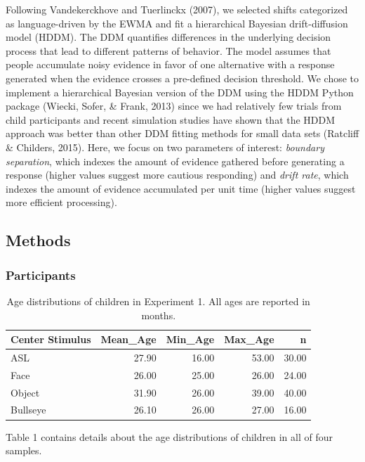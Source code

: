 \documentclass[english,floatsintext,man]{apa6}
\theoremstyle{definition}
\theoremstyle{definition}
\theoremstyle{definition}
\theoremstyle{remark}
\begin{document}
Following Vandekerckhove and Tuerlinckx (2007), we selected shifts
categorized as language-driven by the EWMA and fit a hierarchical
Bayesian drift-diffusion model (HDDM). The DDM quantifies differences in
the underlying decision process that lead to different patterns of
behavior. The model assumes that people accumulate noisy evidence in
favor of one alternative with a response generated when the evidence
crosses a pre-defined decision threshold. We chose to implement a
hierarchical Bayesian version of the DDM using the HDDM Python package
(Wiecki, Sofer, \& Frank, 2013) since we had relatively few trials from
child participants and recent simulation studies have shown that the
HDDM approach was better than other DDM fitting methods for small data
sets (Ratcliff \& Childers, 2015). Here, we focus on two parameters of
interest: \emph{boundary separation}, which indexes the amount of
evidence gathered before generating a response (higher values suggest
more cautious responding) and \emph{drift rate}, which indexes the
amount of evidence accumulated per unit time (higher values suggest more
efficient processing).

\hypertarget{methods}{%
\subsection{Methods}\label{methods}}

\hypertarget{participants}{%
\subsubsection{Participants}\label{participants}}

\begin{table}[b]
\centering
\begin{tabular}{lrrrr}
  \hline
Center Stimulus & Mean\_Age & Min\_Age & Max\_Age & n \\ 
  \hline
ASL & 27.90 & 16.00 & 53.00 & 30.00 \\ 
  Face & 26.00 & 25.00 & 26.00 & 24.00 \\ 
  Object & 31.90 & 26.00 & 39.00 & 40.00 \\ 
  Bullseye & 26.10 & 26.00 & 27.00 & 16.00 \\ 
   \hline
\end{tabular}
\caption{Age distributions of children in Experiment 1. All ages are reported in months.} 
\end{table}

Table 1 contains details about the age distributions of children in all
of four samples.
\end{document}
